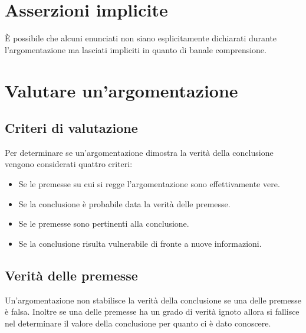 \section{Asserzioni implicite}
\`E possibile che alcuni enunciati non siano esplicitamente dichiarati durante l'argomentazione ma lasciati impliciti in quanto di banale comprensione. 
\section{Valutare un'argomentazione}
\subsection{Criteri di valutazione}
Per determinare se un'argomentazione dimostra la verit\`a della conclusione vengono considerati quattro criteri:
\begin{itemize}
\item Se le premesse su cui si regge l'argomentazione sono effettivamente vere.
\item Se la conclusione \`e probabile data la verit\`a delle premesse.
\item Se le premesse sono pertinenti alla conclusione.
\item Se la conclusione risulta vulnerabile di fronte a nuove informazioni.
\end{itemize}
\subsection{Verit\`a delle premesse}
Un'argomentazione non stabilisce la verit\`a della conclusione se una delle premesse \`e falsa. Inoltre se una delle premesse ha un grado di verit\`a ignoto allora si fallisce nel determinare il valore della 
conclusione per quanto ci \`e dato conoscere. 

